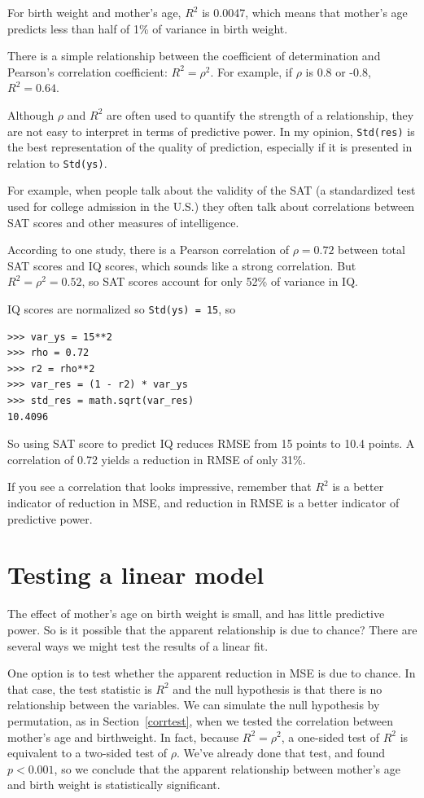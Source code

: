 \documentclass[12pt]{book}
\begin{document}
For birth weight and mother's age, $R^2$ is 0.0047, which means
that mother's age predicts less than half of 1\% of variance in
birth weight.

There is a simple relationship between the coefficient of
determination and Pearson's correlation coefficient: $R^2 = \rho^2$.
For example, if $\rho$ is 0.8 or -0.8, $R^2 = 0.64$.

Although $\rho$ and $R^2$ are often used to quantify the strength of a
relationship, they are not easy to interpret in terms of predictive
power.  In my opinion, {\tt Std(res)} is the best representation
of the quality of prediction, especially if it is presented
in relation to {\tt Std(ys)}.

For example, when people talk about the validity of the SAT
(a standardized test used for college admission in the U.S.) they
often talk about correlations between SAT scores and other measures of
intelligence.

According to one study, there is a Pearson correlation of
$\rho=0.72$ between total SAT scores and IQ scores, which sounds like
a strong correlation.  But $R^2 = \rho^2 = 0.52$, so SAT scores
account for only 52\% of variance in IQ.

IQ scores are normalized so {\tt Std(ys) = 15}, so

\begin{verbatim}
>>> var_ys = 15**2
>>> rho = 0.72
>>> r2 = rho**2
>>> var_res = (1 - r2) * var_ys
>>> std_res = math.sqrt(var_res)
10.4096
\end{verbatim}

So using SAT score to predict IQ reduces RMSE from 15 points to 10.4
points.  A correlation of 0.72 yields a reduction in RMSE of only
31\%.

If you see a correlation that looks impressive, remember that $R^2$ is
a better indicator of reduction in MSE, and reduction in RMSE is a
better indicator of predictive power.


\section{Testing a linear model}

The effect of mother's age on birth weight is small, and has little
predictive power.  So is it possible that the apparent relationship
is due to chance?  There are several ways we might test the
results of a linear fit.

One option is to test whether the apparent reduction in MSE is due to
chance.  In that case, the test statistic is $R^2$ and the null
hypothesis is that there is no relationship between the variables.  We
can simulate the null hypothesis by permutation, as in
Section~\ref{corrtest}, when we tested the correlation between
mother's age and birthweight.  In fact, because $R^2 = \rho^2$, a
one-sided test of $R^2$ is equivalent to a two-sided test of $\rho$.
We've already done that test, and found $p < 0.001$, so we conclude
that the apparent relationship between mother's age and birth weight
is statistically significant.
  
\end{document}
